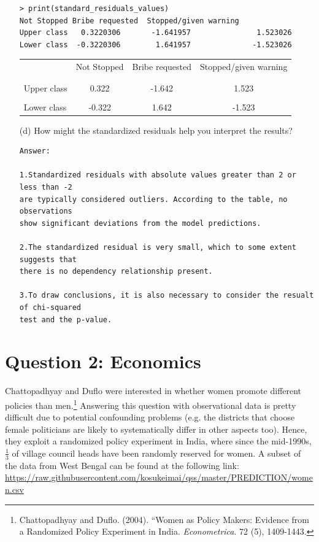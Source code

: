 \documentclass[12pt,letterpaper]{article}
\begin{document}
\begin{enumerate}
	
\begin{verbatim}
> print(standard_residuals_values)
Not Stopped Bribe requested  Stopped/given warning
Upper class   0.3220306       -1.641957               1.523026
Lower class  -0.3220306        1.641957              -1.523026
\end{verbatim} 
		\begin{table}[h]
		\centering
		\begin{tabular}{l | c c c }
			& Not Stopped & Bribe requested & Stopped/given warning \\
			\\[-1.8ex] 
			\hline \\[-1.8ex]
			Upper class   & 0.322 & -1.642 & 1.523  \\
			\\
			Lower class & -0.322 & 1.642  & -1.523   \\
		\end{tabular}
	\end{table}
	\vspace{7cm}
	\item [(d)] How might the standardized residuals help you interpret the results?  
\begin{verbatim}
Answer:

1.Standardized residuals with absolute values greater than 2 or less than -2 
are typically considered outliers. According to the table, no observations 
show significant deviations from the model predictions.

2.The standardized residual is very small, which to some extent suggests that 
there is no dependency relationship present.

3.To draw conclusions, it is also necessary to consider the resualt of chi-squared 
test and the p-value.
\end{verbatim} 
\end{enumerate}
\newpage

\section*{Question 2: Economics}
Chattopadhyay and Duflo were interested in whether women promote different policies than men.\footnote{Chattopadhyay and Duflo. (2004). ``Women as Policy Makers: Evidence from a Randomized Policy Experiment in India. \textit{Econometrica}. 72 (5), 1409-1443.} Answering this question with observational data is pretty difficult due to potential confounding problems (e.g. the districts that choose female politicians are likely to systematically differ in other aspects too). Hence, they exploit a randomized policy experiment in India, where since the mid-1990s, $\frac{1}{3}$ of village council heads have been randomly reserved for women. A subset of the data from West Bengal can be found at the following link: \url{https://raw.githubusercontent.com/kosukeimai/qss/master/PREDICTION/women.csv}\\
\end{document}
